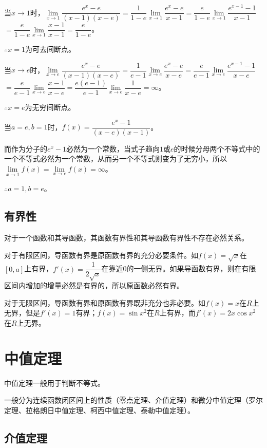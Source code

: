 \documentclass[UTF8, 12pt]{ctexart}
\begin{document}
当$x\to 1$时，$\lim\limits_{x\to 1}\dfrac{e^x-e}{(x-1)(x-e)}$$=\dfrac{1}{1-e}\lim\limits_{x\to 1}\dfrac{e^x-e}{x-1}$$=\dfrac{e}{1-e}\lim\limits_{x\to 1}\dfrac{e^{x-1}-1}{x-1}$$=\dfrac{e}{1-e}\lim\limits_{x\to 1}\dfrac{x-1}{x-1}$$=\dfrac{e}{1-e}$。\medskip

$\therefore x=1$为可去间断点。\medskip

    当$x\to e$时，$\lim\limits_{x\to e}\dfrac{e^x-e}{(x-1)(x-e)}$$=\dfrac{1}{e-1}\lim\limits_{x\to e}\dfrac{e^x-e}{x-e}$$=\dfrac{e}{e-1}\lim\limits_{x\to e}\dfrac{e^{x-1}-1}{x-e}$\medskip$=\dfrac{e}{e-1}\lim\limits_{x\to e}\dfrac{x-1}{x-e}$$=\dfrac{e(e-1)}{e-1}\lim\limits_{x\to e}\dfrac{1}{x-e}=\infty$。\medskip

$\therefore x=e$为无穷间断点。\medskip

    当$a=e,b=1$时，$f(x)=\dfrac{e^x-1}{(x-e)(x-1)}$。\medskip

    而作为分子的$e^x-1$必然为一个常数，当式子趋向$1$或$e$的时候分母两个不等式中的一个不等式必然为一个常数，从而另一个不等式则变为了无穷小，所以$\lim\limits_{x\to 1}f(x)=\lim\limits_{x\to e}f(x)=\infty$。

$\therefore a=1,b=e$。

\subsection{有界性}

对于一个函数和其导函数，其函数有界性和其导函数有界性不存在必然关系。

对于有限区间，导函数有界是原函数有界的充分必要条件。如$f(x)=\sqrt{x}$在$[0,a]$上有界，$f'(x)=\dfrac{1}{2\sqrt{x}}$在靠近0的一侧无界。如果导函数有界，则在有限区间内增加的增量必然是有界的，所以原函数必然有界。

对于无限区间，导函数有界和原函数有界既非充分也非必要。如$f(x)=x$在$R$上无界，但是$f'(x)=1$有界；$f(x)=\sin x^2$在$R$上有界，而$f'(x)=2x\cos x^2$在$R$上无界。

\section{中值定理}

中值定理一般用于判断不等式。

一般分为连续函数闭区间上的性质（零点定理、介值定理）和微分中值定理（罗尔定理、拉格朗日中值定理、柯西中值定理、泰勒中值定理）。

\subsection{介值定理}
\end{document}
